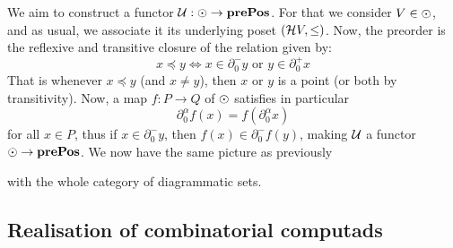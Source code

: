 We aim to construct a functor \( \mathcal{U} : \odot \to \mathbf{prePos} \). For that we consider \( V \in \odot \), and as usual, we associate it its underlying poset \( (\mathcal{H} V, \le) \). Now, the preorder is the reflexive and transitive closure of the relation given by:
\begin{equation*}
    x \preceq y \iff x \in \partial^-_0 y \text{ or } y \in \partial^+_0 x
\end{equation*}
That is whenever \( x \preceq y \) (and \( x \neq y \)), then \( x \) or \( y \) is a point (or both by transitivity). Now, a map \( f : P \to Q \) of \( \odot \) satisfies in particular 
\begin{equation*}
    \partial^\alpha_0f(x) = f(\partial^\alpha_0 x) 
\end{equation*}
for all \( x \in P \), thus if \(  x \in \partial^-_0 y \), then \(  f(x) \in \partial^-_0 f(y) \), making \( \mathcal{U} \) a functor \( \odot \to \mathbf{prePos} \). We now have the same picture as previously
\begin{center}
\end{center}
with the whole category of diagrammatic sets.
\subsection{Realisation of combinatorial computads}

